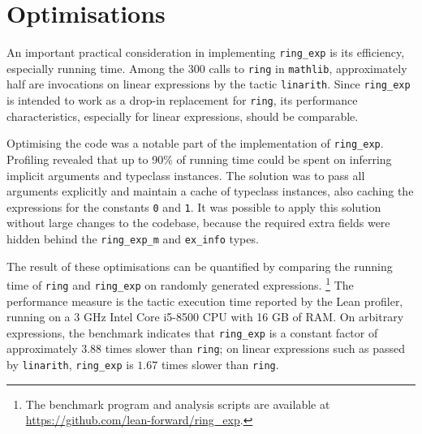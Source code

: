 \documentclass{llncs}
\newcommand{\lean}[1]{\texttt{#1}\xspace} %
\newcommand{\mathlib}{\texttt{mathlib}\xspace}
\newcommand{\ring}{\lean{ring}}
\newcommand{\ringexp}{\lean{ring\_exp}}
\begin{document}
\section{Optimisations}

An important practical consideration in implementing \ringexp is its efficiency, especially running time.
Among the 300 calls to \ring in \mathlib, approximately half are invocations on linear expressions by the tactic \lean{linarith}.
Since \ringexp is intended to work as a drop-in replacement for \lean{ring},
its performance characteristics, especially for linear expressions, should be comparable.

Optimising the code was a notable part of the implementation of \ringexp.
Profiling revealed that up to 90\% of running time could be spent on inferring implicit arguments and typeclass instances.
The solution was to pass all arguments explicitly and maintain a cache of typeclass instances,
also caching the expressions for the constants \lean{0} and \lean{1}.
It was possible to apply this solution without large changes to the codebase,
because the required extra fields were hidden behind the \lean{ring\_exp\_m} and \lean{ex\_info} types.



The result of these optimisations can be quantified by comparing the running time of \ring and \ringexp on randomly generated expressions.%
\footnote{The benchmark program and analysis scripts are available at \url{https://github.com/lean-forward/ring_exp}.}
The performance measure is the tactic execution time reported by the Lean profiler,
running on a 3 GHz Intel\textregistered\xspace Core\texttrademark\xspace i5-8500 CPU with 16 GB of RAM.
On arbitrary expressions, the benchmark indicates that \ringexp is a constant factor of approximately $3.88$ times slower than \ring;
on linear expressions such as passed by \lean{linarith},
\ringexp is $1.67$ times slower than \ring.
\end{document}
